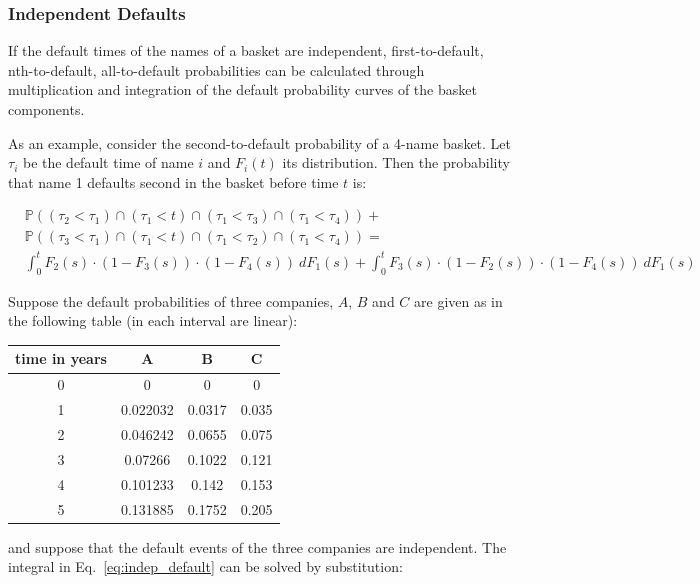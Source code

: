 \subsubsection{Independent Defaults}\label{independent-defaults}

If the default times of the names of a basket are independent,
first-to-default, nth-to-default, all-to-default probabilities can be
calculated through multiplication and integration of the default
probability curves of the basket components.

As an example, consider the second-to-default probability of a 4-name
basket. Let \(\tau_i\) be the default time of name \(i\) and \(F_i(t)\)
its distribution. Then the probability that name 1 defaults second in
the basket before time \(t\) is:

\begin{equation}
\begin{split}
&\mathbb{P}((\tau_2\lt\tau_1)\cap (\tau_1\lt t)\cap (\tau_1\lt\tau_3)\cap (\tau_1\lt\tau_4)) +\\
&\mathbb{P}((\tau_3\lt\tau_1)\cap (\tau_1\lt t)\cap (\tau_1\lt\tau_2)\cap (\tau_1\lt\tau_4)) =\\
&\int_0^t{F_2 (s)\cdot (1-F_3 (s)) \cdot (1-F_4 (s))~dF_1(s)} +  \int_0^t{F_3 (s)\cdot (1-F_2 (s)) \cdot (1-F_4 (s))~dF_1(s)}
\end{split}
\label{eq:indep_default}
\end{equation}

Suppose the default probabilities of three companies, $A$, $B$ and $C$ are
given as in the following table (in each interval are linear):

\begin{center}
	\begin{tabular}{|c|c|c|c|}
		time in years & A & B & C \\
		\hline
		0 & 0 & 0 & 0 \\
		1 & 0.022032 & 0.0317 & 0.035 \\
		2 & 0.046242 & 0.0655 & 0.075 \\
		3 & 0.07266 & 0.1022 & 0.121 \\
		4 & 0.101233 & 0.142 & 0.153 \\
		5 & 0.131885 & 0.1752 & 0.205 \\
	\end{tabular}
\end{center}
and suppose that the default events of the three companies are
independent. The integral in Eq.~\ref{eq:indep_default} can be solved by substitution:

